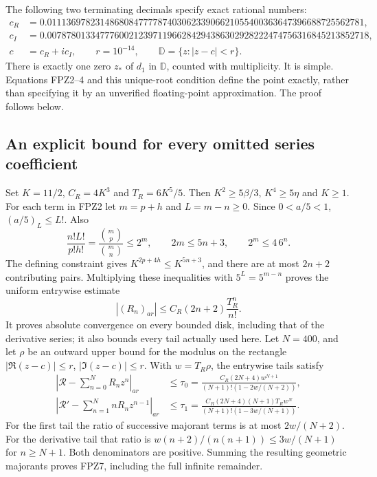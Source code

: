 \documentclass[11pt]{article}
\begin{document}
The following two terminating decimals specify exact rational numbers:
\[
 \begin{split}
 c_R&=0.011136978231486808477778740306233906621055400363647396688725562781,\\
 c_I&=0.0078780133477760021239711966284294386302928222474756316845213852718,\\
 c&=c_R+ic_I,\qquad r=10^{-14},\qquad
 \mathbb D=\{z:|z-c|<r\}.
 \end{split}\tag{FPZ4}
\]
There is exactly one zero $z_*$ of $d_1$ in $\mathbb D$, counted with
multiplicity. It is simple. Equations FPZ2--4 and this unique-root
condition define the point exactly, rather than specifying it by an
unverified floating-point approximation. The proof follows below.

\subsection{An explicit bound for every omitted series coefficient}
Set $K=11/2$, $C_R=4K^3$ and $T_R=6K^5/5$. Then
$K^2\ge5\beta/3$, $K^4\ge5\eta$ and $K\ge1$. For each term in
FPZ2 let $m=p+h$ and $L=m-n\ge0$. Since $0<a/5<1$,
$(a/5)_L\le L!$. Also
\[
 \frac{n!L!}{p!h!}=\frac{\binom mp}{\binom mn}\le2^m,
 \qquad 2m\le5n+3,\qquad 2^m\le4\,6^n.
 \tag{FPZ5}
\]
The defining constraint gives $K^{2p+4h}\le K^{5n+3}$, and there
are at most $2n+2$ contributing pairs. Multiplying these inequalities
with $5^L=5^{m-n}$ proves the uniform entrywise estimate
\[
 |(R_n)_{ar}|\le C_R(2n+2)\frac{T_R^n}{n!}.
 \tag{FPZ6}
\]
It proves absolute convergence on every bounded disk, including that
of the derivative series; it also bounds every tail actually used here.
Let $N=400$, and let $\rho$ be an outward upper bound for the modulus
on the rectangle $|\Re(z-c)|\le r$, $|\Im(z-c)|\le r$.
With $w=T_R\rho$, the entrywise tails satisfy
\[
 \begin{split}
 \left|\mathcal R-\sum_{n=0}^N R_nz^n\right|_{ar}
 &\le\tau_0=
 \frac{C_R(2N+4)w^{N+1}}{(N+1)!(1-2w/(N+2))},\\
 \left|\mathcal R'-\sum_{n=1}^N nR_nz^{n-1}\right|_{ar}
 &\le\tau_1=
 \frac{C_R(2N+4)(N+1)T_Rw^N}
 {(N+1)!(1-3w/(N+1))}.
 \end{split}\tag{FPZ7}
\]
For the first tail the ratio of successive majorant terms is at most
$2w/(N+2)$. For the derivative tail that ratio is
$w(n+2)/(n(n+1))\le3w/(N+1)$ for $n\ge N+1$.
Both denominators are positive. Summing the resulting geometric
majorants proves FPZ7, including the full infinite remainder.
\end{document}

